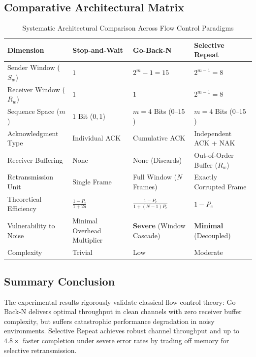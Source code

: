 \documentclass[11pt,a4paper]{article}
\begin{document}
\subsection{Comparative Architectural Matrix}
\begin{table}[htbp]
\centering
\scriptsize
\renewcommand{\arraystretch}{1.18}
\begin{tabular}{p{3.5cm} >{\centering}p{3.2cm} >{\centering}p{3.2cm} >{\centering\arraybackslash}p{3.2cm}}
\rowcolor{tableheader}
\color{white}Dimension & \color{white}Stop-and-Wait & \color{white}Go-Back-N & \color{white}Selective Repeat \\
\hline
Sender Window ($S_w$) & $1$ & $2^m - 1 = 15$ & $2^{m-1} = 8$ \\
Receiver Window ($R_w$) & $1$ & $1$ & $2^{m-1} = 8$ \\
Sequence Space ($m$) & $1$ Bit ($0, 1$) & $m=4$ Bits ($0$--$15$) & $m=4$ Bits ($0$--$15$) \\
Acknowledgment Type & Individual ACK & Cumulative ACK & Independent ACK + NAK \\
Receiver Buffering & None & None (Discards) & Out-of-Order Buffer ($R_w$) \\
Retransmission Unit & Single Frame & Full Window ($N$ Frames) & Exactly Corrupted Frame \\
Theoretical Efficiency & $\frac{1-P_e}{1+2a}$ & $\frac{1-P_e}{1+(N-1)P_e}$ & $1 - P_e$ \\
Vulnerability to Noise & Minimal Overhead Multiplier & \textbf{Severe} (Window Cascade) & \textbf{Minimal} (Decoupled) \\
Complexity & Trivial & Low & Moderate \\
\bottomrule
\end{tabular}
\caption{Systematic Architectural Comparison Across Flow Control Paradigms}
\label{tab:comparison}
\end{table}

\subsection{Summary Conclusion}
The experimental results rigorously validate classical flow control theory: Go-Back-N delivers optimal throughput in clean channels with zero receiver buffer complexity, but suffers catastrophic performance degradation in noisy environments. Selective Repeat achieves robust channel throughput and up to $4.8\times$ faster completion under severe error rates by trading off memory for selective retransmission.
\end{document}
